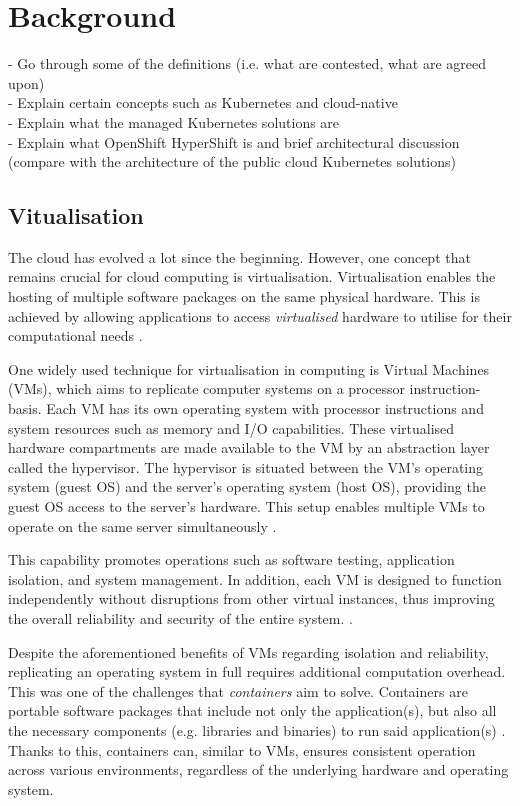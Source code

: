 \chapter{Background}

- Go through some of the definitions (i.e. what are contested, what are agreed upon)\\
- Explain certain concepts such as Kubernetes and cloud-native\\
- Explain what the managed Kubernetes solutions are\\
- Explain what OpenShift HyperShift is and brief architectural discussion (compare with the architecture of the public cloud Kubernetes solutions)\\


\section{Vitualisation}

The cloud has evolved a lot since the beginning. However, one concept that remains crucial for cloud computing is virtualisation. Virtualisation enables the hosting of multiple software packages on the same physical hardware. This is achieved by allowing applications to access \textit{virtualised} hardware to utilise for their computational needs \cite{goldbergSurveyVirtualMachine1974}.

One widely used technique for virtualisation in computing is Virtual Machines (VMs), which aims to replicate computer systems on a processor instruction-basis. Each VM has its own operating system with processor instructions and system resources such as memory and I/O capabilities. These virtualised hardware compartments are made available to the VM by an abstraction layer called the hypervisor. The hypervisor is situated between the VM's operating system (guest OS) and the server's operating system (host OS), providing the guest OS access to the server's hardware. This setup enables multiple VMs to operate on the same server simultaneously \cite{goldbergSurveyVirtualMachine1974}.

This capability promotes operations such as software testing, application isolation, and system management. In addition, each VM is designed to function independently without disruptions from other virtual instances, thus improving the overall reliability and security of the entire system. \cite{goldbergSurveyVirtualMachine1974}.

Despite the aforementioned benefits of VMs regarding isolation and reliability, replicating an operating system in full requires additional computation overhead. This was one of the challenges that \textit{containers} aim to solve. Containers are portable software packages that include not only the application(s), but also all the necessary components (e.g. libraries and binaries) to run said application(s) \cite{bernsteinContainersCloudLXC2014}. Thanks to this, containers can, similar to VMs, ensures consistent operation across various environments, regardless of the underlying hardware and operating system.

